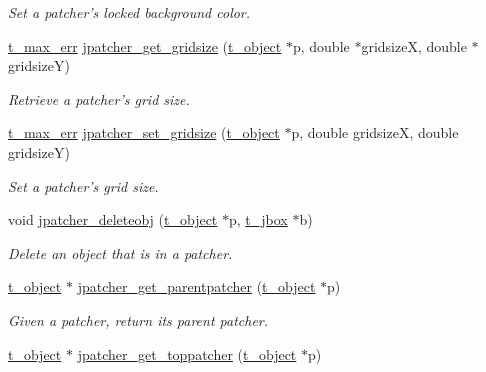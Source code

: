 \begin{DoxyCompactItemize}
\begin{DoxyCompactList}\small\item\em Set a patcher's locked background color. \item\end{DoxyCompactList}\item 
\hyperlink{group__datatypes_ga73edaae82b318855cc09fac994918165}{t\_\-max\_\-err} \hyperlink{group__jpatcher_ga140e8da3e2be163b5cbbb1eef350d70f}{jpatcher\_\-get\_\-gridsize} (\hyperlink{structt__object}{t\_\-object} $\ast$p, double $\ast$gridsizeX, double $\ast$gridsizeY)
\begin{DoxyCompactList}\small\item\em Retrieve a patcher's grid size. \item\end{DoxyCompactList}\item 
\hyperlink{group__datatypes_ga73edaae82b318855cc09fac994918165}{t\_\-max\_\-err} \hyperlink{group__jpatcher_ga34113c97506a3a5c25d3a00805f43b38}{jpatcher\_\-set\_\-gridsize} (\hyperlink{structt__object}{t\_\-object} $\ast$p, double gridsizeX, double gridsizeY)
\begin{DoxyCompactList}\small\item\em Set a patcher's grid size. \item\end{DoxyCompactList}\item 
void \hyperlink{group__jpatcher_ga669798a90e3928a04b0f65143a7981fd}{jpatcher\_\-deleteobj} (\hyperlink{structt__object}{t\_\-object} $\ast$p, \hyperlink{structt__jbox}{t\_\-jbox} $\ast$b)
\begin{DoxyCompactList}\small\item\em Delete an object that is in a patcher. \item\end{DoxyCompactList}\item 
\hyperlink{structt__object}{t\_\-object} $\ast$ \hyperlink{group__jpatcher_ga337a58107a3555e2de7da75893840920}{jpatcher\_\-get\_\-parentpatcher} (\hyperlink{structt__object}{t\_\-object} $\ast$p)
\begin{DoxyCompactList}\small\item\em Given a patcher, return its parent patcher. \item\end{DoxyCompactList}\item 
\hyperlink{structt__object}{t\_\-object} $\ast$ \hyperlink{group__jpatcher_gab0fbb44da944b038c690efb0b2415a7a}{jpatcher\_\-get\_\-toppatcher} (\hyperlink{structt__object}{t\_\-object} $\ast$p)

\end{DoxyCompactItemize}

